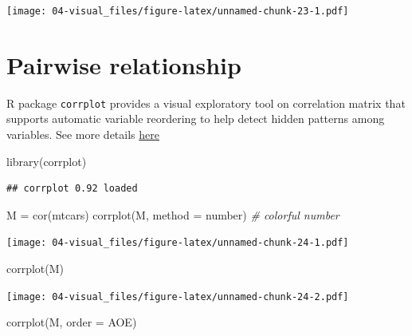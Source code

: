 \documentclass[
]{book}
\newenvironment{Shaded}{\begin{snugshade}}{\end{snugshade}}
\newcommand{\AttributeTok}[1]{\textcolor[rgb]{0.77,0.63,0.00}{#1}}
\newcommand{\CommentTok}[1]{\textcolor[rgb]{0.56,0.35,0.01}{\textit{#1}}}
\newcommand{\FunctionTok}[1]{\textcolor[rgb]{0.00,0.00,0.00}{#1}}
\newcommand{\NormalTok}[1]{#1}
\newcommand{\OtherTok}[1]{\textcolor[rgb]{0.56,0.35,0.01}{#1}}
\newcommand{\StringTok}[1]{\textcolor[rgb]{0.31,0.60,0.02}{#1}}
\begin{document}
\texttt{[image: 04-visual\_files/figure-latex/unnamed-chunk-23-1.pdf]}

\hypertarget{pairwise-relationship}{%
\section{Pairwise relationship}\label{pairwise-relationship}}

R package \texttt{corrplot} provides a visual exploratory tool on correlation matrix that supports automatic variable reordering to help detect hidden patterns among variables. See more details \href{https://cran.r-project.org/web/packages/corrplot/vignettes/corrplot-intro.html}{here}

\begin{Shaded}
\begin{Highlighting}[]
\FunctionTok{library}\NormalTok{(corrplot)}
\end{Highlighting}
\end{Shaded}

\begin{verbatim}
## corrplot 0.92 loaded
\end{verbatim}

\begin{Shaded}
\begin{Highlighting}[]
\NormalTok{M }\OtherTok{=} \FunctionTok{cor}\NormalTok{(mtcars)}
\FunctionTok{corrplot}\NormalTok{(M, }\AttributeTok{method =} \StringTok{\textquotesingle{}number\textquotesingle{}}\NormalTok{) }\CommentTok{\# colorful number}
\end{Highlighting}
\end{Shaded}

\texttt{[image: 04-visual\_files/figure-latex/unnamed-chunk-24-1.pdf]}

\begin{Shaded}
\begin{Highlighting}[]
\FunctionTok{corrplot}\NormalTok{(M)}
\end{Highlighting}
\end{Shaded}

\texttt{[image: 04-visual\_files/figure-latex/unnamed-chunk-24-2.pdf]}

\begin{Shaded}
\begin{Highlighting}[]
\FunctionTok{corrplot}\NormalTok{(M, }\AttributeTok{order =} \StringTok{\textquotesingle{}AOE\textquotesingle{}}\NormalTok{)}
\end{Highlighting}
\end{Shaded}
\end{document}
